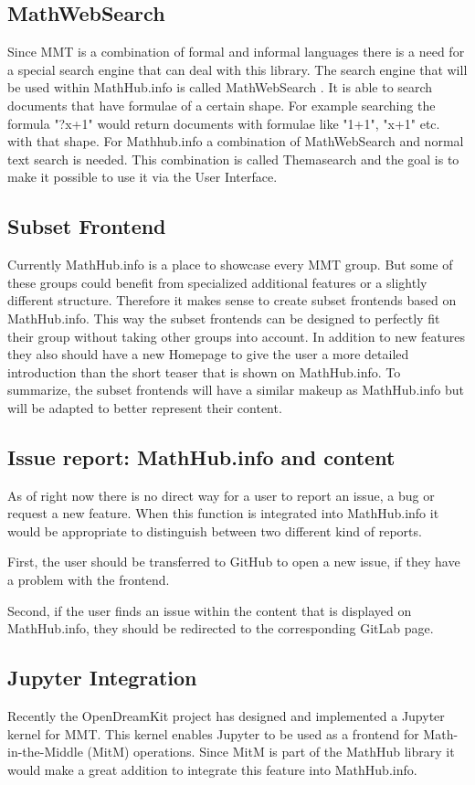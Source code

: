 \documentclass[11pt,a4paper]{article}
\begin{document}
\subsection{MathWebSearch}
Since MMT is a combination of formal and informal languages there is a need for a special search engine that can deal with this library.
The search engine that will be used within MathHub.info is called MathWebSearch \cite{HamKoh:fsfm15}.
It is able to search documents that have formulae of a certain shape.
For example searching the formula "?x+1" would return documents with formulae like "1+1", "x+1" etc. with that shape.
For Mathhub.info a combination of MathWebSearch and normal text search is needed.
This combination is called Themasearch and the goal is to make it possible to use it via the User Interface.

\subsection{Subset Frontend}
Currently MathHub.info is a place to showcase every MMT group.
But some of these groups could benefit from specialized additional features or a slightly different structure.
Therefore it makes sense to create subset frontends based on MathHub.info.
This way the subset frontends can be designed to perfectly fit their group without taking other groups into account.
In addition to new features they also should have a new Homepage to give the user a more detailed introduction than the short teaser that is shown on MathHub.info.
To summarize, the subset frontends will have a similar makeup as MathHub.info but will be adapted to better represent their content.

\subsection{Issue report: MathHub.info and content}
As of right now there is no direct way for a user to report an issue, a bug or request a new feature.
When this function is integrated into MathHub.info it would be appropriate to distinguish between two different kind of reports.

First, the user should be transferred to GitHub to open a new issue, if they have a problem with the frontend.

Second, if the user finds an issue within the content that is displayed on MathHub.info, they should be redirected to the corresponding GitLab page. 
\subsection{Jupyter Integration}
Recently the OpenDreamKit project has designed and implemented a Jupyter kernel \cite{notebook} for MMT. 
This kernel enables Jupyter to be used as a frontend for Math-in-the-Middle (MitM) operations.
Since MitM is part of the MathHub library it would make a great addition to integrate this feature into MathHub.info.
\newpage
\printbibliography
\end{document}
